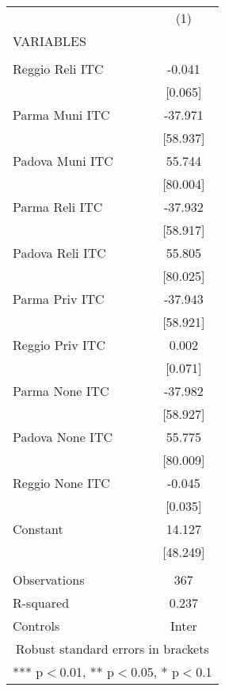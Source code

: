 \begin{tabular}{lc} \hline
 & (1) \\
VARIABLES &  \\ \hline
 &  \\
Reggio Reli ITC & -0.041 \\
 & [0.065] \\
Parma Muni ITC & -37.971 \\
 & [58.937] \\
Padova Muni ITC & 55.744 \\
 & [80.004] \\
Parma Reli ITC & -37.932 \\
 & [58.917] \\
Padova Reli ITC & 55.805 \\
 & [80.025] \\
Parma Priv ITC & -37.943 \\
 & [58.921] \\
Reggio Priv ITC & 0.002 \\
 & [0.071] \\
Parma None ITC & -37.982 \\
 & [58.927] \\
Padova None ITC & 55.775 \\
 & [80.009] \\
Reggio None ITC & -0.045 \\
 & [0.035] \\
Constant & 14.127 \\
 & [48.249] \\
 &  \\
Observations & 367 \\
R-squared & 0.237 \\
 Controls & Inter \\ \hline
\multicolumn{2}{c}{ Robust standard errors in brackets} \\
\multicolumn{2}{c}{ *** p$<$0.01, ** p$<$0.05, * p$<$0.1} \\
\end{tabular}
